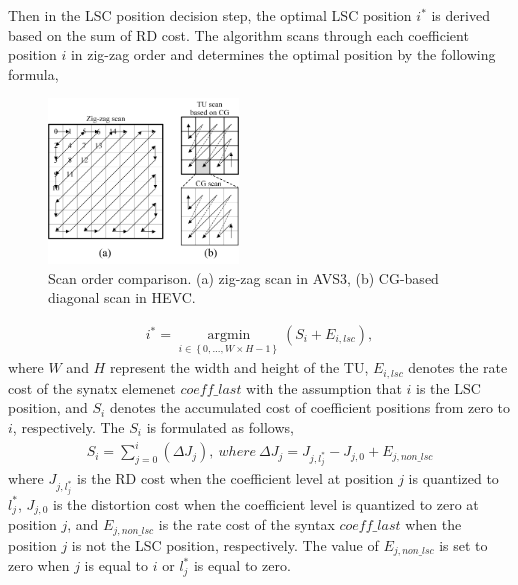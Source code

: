 \documentclass[lettersize,journal]{IEEEtran}
\begin{document}
Then in the LSC position decision step, the optimal LSC position $i_{}^{*}$ is derived based on the sum of RD cost. The algorithm scans through each coefficient position $i$ in zig-zag order and determines the optimal position by the following formula,
\begin{figure}[!b]
	\centering
	\centerline{\includegraphics[width=0.45\textwidth]{figure/scan.png}} 
	\caption{Scan order comparison. (a) zig-zag scan in AVS3, (b) CG-based diagonal scan in HEVC.}
	\label{scan} %
\end{figure}

\begin{equation}
	\begin{aligned}
		\label{i_optimal}
		i_{}^{*} =\mathop{\arg\min}\limits_{i \in \left \{ 0,...,W\times H-1\right \} } \left ( S_{i} + E_{i,lsc}   \right ),
	\end{aligned}
\end{equation}
where $W$ and $H$ represent the width and height of the TU, $E_{i,lsc}$ denotes the rate cost of the synatx elemenet $coeff\_last$ with the assumption that $i$ is the LSC position, and $S_{i}$ denotes the accumulated cost of coefficient positions from zero to $i$, respectively. The $S_{i}$ is formulated as follows, 
\begin{equation}
	\begin{aligned}
		\label{A_i,last}
S_{i} = \sum_{j=0}^{i}\left ( \Delta J_{j} \right), \ where \   \Delta J_{j} = J_{j,l_{j}^{*}} - J_{j,0} + E_{j,non\_lsc}
	\end{aligned}
\end{equation}
where $J_{j,l_{j}^{*}}$ is the RD cost when the coefficient level at position $j$ is quantized to $l_{j}^{*}$, $J_{j,0}$ is the distortion cost when the coefficient level is quantized to zero at position $j$, and $E_{j,non\_lsc}$ is the rate cost of the syntax $coeff\_last$ when the position $j$ is not the LSC position, respectively. The value of $E_{j,non\_lsc}$ is set to zero when $j$ is equal to $i$ or $l_{j}^{*}$ is equal to zero. 
\end{document}
